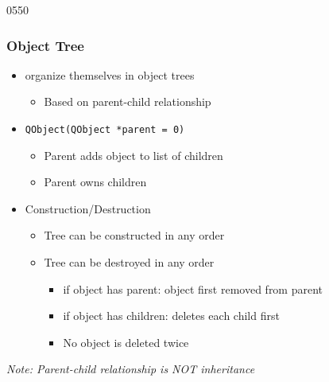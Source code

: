 \begin{slide}{0550} \label{parent_child} \frametitle{Object Tree}
\begin{itemize}
  \item {} organize themselves in object trees
    \begin{itemize}
    \item Based on parent-child relationship
    \end{itemize}
  \item \texttt{QObject(QObject *parent = 0)}
    \begin{itemize}
    \item Parent adds object to list of children
    \item Parent owns children
    \end{itemize}
  \item Construction/Destruction
    \begin{itemize}
   \item Tree can be constructed in any order
    \item Tree can be destroyed in any order
      \begin{itemize}
      \item if object has parent: object first removed from parent
      \item if object has children: deletes each child first
      \item No object is deleted twice
      \end{itemize}
    \end{itemize}
 \end{itemize}
 \medskip
  \textit{Note: Parent-child relationship is NOT inheritance}
\end{slide}


